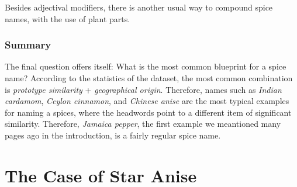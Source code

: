 Besides adjectival modifiers, there is another usual way to compound spice names, with the use of plant parts.


\subsubsection{Summary}

The final question offers itself: What is the most common blueprint for a spice name? According to the statistics of the dataset, the most common combination is \textit{prototype similarity} + \textit{geographical origin}. Therefore, names such as \textit{Indian cardamom}, \textit{Ceylon cinnamon}, and \textit{Chinese anise} are the most typical examples for naming a spices, where the headwords point to a different item of significant similarity. Therefore, \textit{Jamaica pepper}, the first example we meantioned many pages ago in the introduction, is a fairly regular spice name.













\section{The Case of Star Anise}
\label{sec:case_star_anise}

